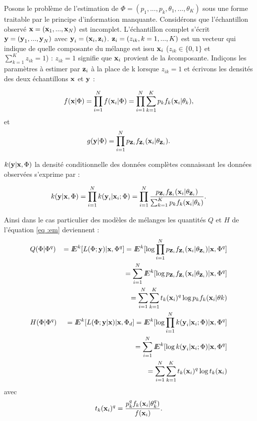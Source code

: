Posons le probl\`eme de l'estimation de $\Phi=(p_1,...,p_k, \theta_1,...,\theta_K)$
sous une forme traitable par le principe d'information
manquante. Consid\'erons que l'\'echantillon observ\'e $\mbox{\bf x}=(\mbox{\bf x}_1,...,\mbox{\bf x}_N)$ est
incomplet. L'\'echantillon complet s'\'ecrit $\mbox{\bf y}=(\mbox{\bf y}_1,...,\mbox{\bf y}_N)$ avec 
$\mbox{\bf y}_i=(\mbox{\bf x}_i,\mbox{\bf z}_i)$. $\mbox{\bf z}_i=(z_{ik},k=1,...,K)$ est un vecteur qui indique 
de quelle composante du m\'elange est issu $\mbox{\bf x}_i$ 
($z_{ik} \in \{0,1\}$ et $\sum_{k=1}^K  z_{ik}=1$) :
$z_{ik}=1$ signifie que $\mbox{\bf x}_i$ provient de la $k$\ieme composante.
Indi\c{c}ons les param\`etres \`a estimer par $\mbox{\bf z}_i$ \`a la place de k lorsque
$z_{ik}=1$ et \'ecrivons les densit\'es des deux \'echantillons $\mbox{\bf x}$ et $\mbox{\bf y}$ :

\begin{equation}
f(\mbox{\bf x} | \Phi)=\prod_{i=1}^N f(\mbox{\bf x}_i | \Phi)=
\prod_{i=1}^N  \sum_{k=1}^{K} p_{k} f_k(\mbox{\bf x}_i | \theta_k),
\end{equation}
et
\begin{equation}
g(\mbox{\bf y} | \Phi)=\prod_{i=1}^N  p_{\mbox{\bf z}_i} f_{\mbox{\bf z}_i}(\mbox{\bf x}_i | \theta_{\mbox{\bf z}_i}).
\end{equation}
  
$k(\mbox{\bf y} |  \mbox{\bf x}, \Phi)$ la densit\'e conditionnelle des donn\'ees
compl\`etes connaissant les donn\'ees observ\'ees s'exprime par :

\begin{equation}
k(\mbox{\bf y} |  \mbox{\bf x}, \Phi)=\prod_{i=1}^N  k(\mbox{\bf y}_i | \mbox{\bf x}_i;\Phi)=
\prod_{i=1}^N \frac{p_{\mbox{\bf z}_i} f_{\mbox{\bf z}_i}(\mbox{\bf x}_i | \theta_{\mbox{\bf z}_i})}
{\sum_{k=1}^{K} p_{k} f_k(\mbox{\bf x}_i | \theta_{k})}.
\end{equation}
 
Ainsi dans le cas particulier des mod\`eles de m\'elanges les quantit\'es $Q$ et $H$ de
l'\'equation \ref{eq :em} deviennent : 
\begin{eqnarray*}
& Q(\Phi | \Phi^q) &= \E^k [L(\Phi;\y) | \x, \Phi^q]=
                     \E^k [\log{\prod_{i=1}^N  p_{\z_i} f_{\z_i}(\x_i |
                     \theta_{\z_i})} | \x, \Phi^q]\\
&                  &= \sum_{i=1}^N \E^k [\log{ p_{\z_i} f_{\z_i}(\x_i |
                     \theta_{\z_i})} | \x, \Phi^q]\\
&                  & =\sum_{i=1}^N \sum_{k=1}^{K} t_k(\x_i)^q \log{p_{k} f_k(\x_i |\theta{k})}\\
& H(\Phi | \Phi^q) &= \E^k [L(\Phi;\y | \x) | \x, \Phi_d ]=
                     \E^k [\log{\prod_{i=1}^N  k(\y_i | \x_i;\Phi)} | \x, \Phi^q]\\
&                  &= \sum_{i=1}^N \E^k [\log{ k(\y_i | \x_i;\Phi)} | \x, \Phi^q]\\
&                  & =\sum_{i=1}^N \sum_{k=1}^{K} t_k(\x_i)^q \log{t_k(\x_i)}
\end{eqnarray*}
avec
\begin{equation}
t_k(\mbox{\bf x}_i)^q=\frac{p^q_{k} f_k(\mbox{\bf x}_i | \theta^q_{k})}{f(\mbox{\bf x}_i )}.
\end{equation}


